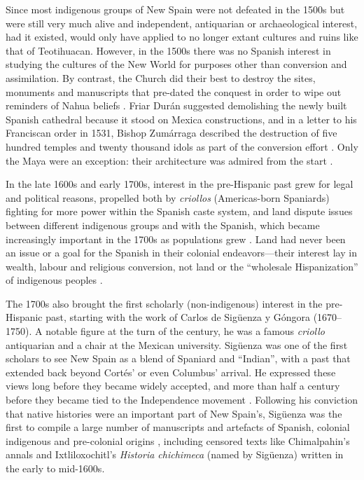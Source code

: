 Since most indigenous groups of New Spain were not defeated in the 1500s but were still very much alive and independent, antiquarian or archaeological interest, had it existed, would only have applied to no longer extant cultures and ruins like that of Teotihuacan. However, in the 1500s there was no Spanish interest in studying the cultures of the New World for purposes other than conversion and assimilation. By contrast, the Church did their best to destroy the sites, monuments and manuscripts that pre-dated the conquest in order to wipe out reminders of Nahua beliefs \parencite[36]{Bernal1980}. 
Friar Durán suggested demolishing the newly built Spanish cathedral because it stood on Mexica constructions, and in a letter to his Franciscan order in 1531, Bishop Zumárraga described the destruction of five hundred temples and twenty thousand idols as part of the conversion effort \parencite[36,39]{Bernal1980}. 
Only the Maya were an exception: their architecture was admired from the start \parencite[42]{Bernal1980}. 


In the late 1600s and early 1700s, interest in the pre-Hispanic past grew for legal and political reasons, propelled both by \emph{criollos} (Americas-born Spaniards) fighting for more power within the Spanish caste system, and land dispute issues between different indigenous groups and with the Spanish, which became increasingly important in the 1700s as populations grew \parencites[49]{Bernal1980}[122]{Restall2003}. 
Land had never been an issue or a goal for the Spanish in their colonial endeavors—their interest lay in wealth, labour and religious conversion, not land or the “wholesale Hispanization” of indigenous peoples \parencite[75]{Restall2003}.

The 1700s also brought the first scholarly (non-indigenous) interest in the pre-Hispanic past, starting with the work of Carlos de Sigüenza y Góngora (1670–1750). A notable figure at the turn of the century, he was a famous \emph{criollo} antiquarian and a chair at the Mexican university. 
Sigüenza was one of the first scholars to see New Spain as a blend of Spaniard and “Indian”, with a past that extended back beyond Cortés’ or even Columbus’ arrival. He expressed these views long before they became widely accepted, and more than half a century before they became tied to the Independence movement \parencite[52]{Bernal1980}. 
Following his conviction that native histories were an important part of New Spain’s, Sigüenza was the first to compile a large number of manuscripts and artefacts of Spanish, colonial indigenous and pre-colonial origins \parencite[50-51]{Bernal1980}, 
including censored texts like Chimalpahin’s annals and Ixtliloxochitl’s \emph{Historia chichimeca} (named by Sigüenza) written in the early to mid-1600s. 

